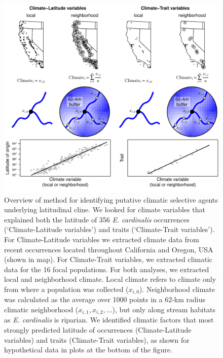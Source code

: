 \documentclass[11pt, oneside]{article}
\begin{document}
\begin{figure}[h!]
	\centerline{\includegraphics[width=1\textwidth]{Figures/Figure_VarSelect.pdf}}
	\fontsize{10}{12}
	\selectfont
	\caption[Climatic variable selection]{Overview of method for identifying putative climatic selective agents underlying latitudinal cline. We looked for climate variables that explained both the latitude of 356 \textit{E. cardinalis} occurrences (`Climate-Latitude variables') and traits (`Climate-Trait variables'). For Climate-Latitude variables we extracted climate data from recent occurrences located throughout California and Oregon, USA (shown in map). For Climate-Trait variables, we extracted climatic data for the 16 focal populations. For both analyses, we extracted local and neighborhood climate. Local climate refers to climate only from where a population was collected ($x_{i,0}$). Neighborhood climate was calculated as the average over 1000 points in a 62-km radius climatic neighborhood ($x_{i,1}, x_{i,2}, \dots$), but only along stream habitats as \textit{E. cardinalis} is riparian. We identified climatic factors that most strongly predicted latitude of occurrences (Climate-Latitude variables) and traits (Climate-Trait variables), as shown for hypothetical data in plots at the bottom of the figure.}
	\label{fig:Fig_VarSelect}
\end{figure}
\end{document}

